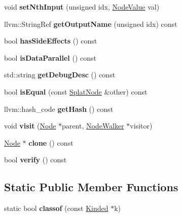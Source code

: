 \begin{DoxyCompactItemize}
void {\bfseries set\+Nth\+Input} (unsigned idx, \hyperlink{structglow_1_1_node_value}{Node\+Value} val)
\item 
\mbox{\label{classglow_1_1_splat_node_a5c23c17f7a44dc075c80f29e5e71985a}} 
llvm\+::\+String\+Ref {\bfseries get\+Output\+Name} (unsigned idx) const
\item 
\mbox{\label{classglow_1_1_splat_node_a160ea683c09ab6135a5ec4037c3bf714}} 
bool {\bfseries has\+Side\+Effects} () const
\item 
\mbox{\label{classglow_1_1_splat_node_a53892ccdc1ccbc40c12c332b4eb3ea1e}} 
bool {\bfseries is\+Data\+Parallel} () const
\item 
\mbox{\label{classglow_1_1_splat_node_ae191bb7c7d1d1c5d8b75e1336271891f}} 
std\+::string {\bfseries get\+Debug\+Desc} () const
\item 
\mbox{\label{classglow_1_1_splat_node_a4f90a9481802bb7c747170048f807809}} 
bool {\bfseries is\+Equal} (const \hyperlink{classglow_1_1_splat_node}{Splat\+Node} \&other) const
\item 
\mbox{\label{classglow_1_1_splat_node_a27a0f0799d9364c31de9143b189e4975}} 
llvm\+::hash\+\_\+code {\bfseries get\+Hash} () const
\item 
\mbox{\label{classglow_1_1_splat_node_a94f13cb2a33592d1ac498100761bbfa7}} 
void {\bfseries visit} (\hyperlink{classglow_1_1_node}{Node} $\ast$parent, \hyperlink{classglow_1_1_node_walker}{Node\+Walker} $\ast$visitor)
\item 
\mbox{\label{classglow_1_1_splat_node_ab2e6c54eb4c1271dd1127078171305dc}} 
\hyperlink{classglow_1_1_node}{Node} $\ast$ {\bfseries clone} () const
\item 
\mbox{\label{classglow_1_1_splat_node_a16c197e0b2af896da2c7a6aca41025f0}} 
bool {\bfseries verify} () const
\end{DoxyCompactItemize}
\subsection*{Static Public Member Functions}
\begin{DoxyCompactItemize}
\item 
\mbox{\label{classglow_1_1_splat_node_ac93f743e719ebb9f5db23c6e97959947}} 
static bool {\bfseries classof} (const \hyperlink{classglow_1_1_kinded}{Kinded} $\ast$k)
\end{DoxyCompactItemize}
